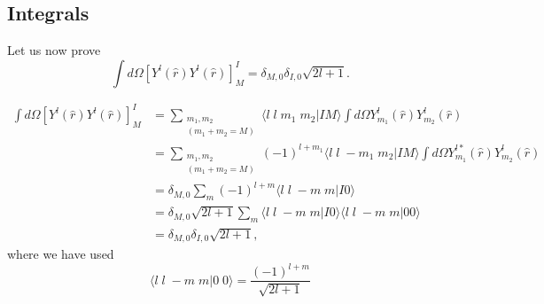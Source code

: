 \begin{subappendices}
\subsection{Integrals}
Let us now prove
\begin{equation}\label{eq14}
\int d\Omega \left[ Y^{l}(\hat r)Y^{l}(\hat r) \right]^{I}_{M}=\delta_{M,0}\delta_{I,0}\sqrt{2l+1}.
\end{equation}

\begin{equation}\label{eq15}
\begin{split}
\int d\Omega \left[ Y^{l}(\hat r)Y^{l}(\hat r) \right]^{I}_{M}&= \sum_{\substack{m_1,m_2\\(m_1+m_2=M)}}
\langle l\; l \; m_1\;m_2 | I M\rangle \int d\Omega  Y_{m_1}^{l}(\hat r)Y_{m_2}^{l}(\hat r)\\
&=\sum_{\substack{m_1,m_2\\(m_1+m_2=M)}} (-1)^{l+m_1} \langle l\; l \; -m_1\;m_2 | I M\rangle
\int d\Omega  Y_{m_1}^{l*}(\hat r)Y_{m_2}^{l}(\hat r)\\
&= \delta_{M,0}\sum_m (-1)^{l+m} \langle l\; l \; -m\;m | I 0\rangle \\
&= \delta_{M,0}\sqrt{2l+1}\sum_m  \langle l\; l \; -m\;m | I 0\rangle \langle l\; l \; -m\;m | 0 0\rangle \\
&= \delta_{M,0}\delta_{I,0}\sqrt{2l+1},
\end{split}
\end{equation}
where we have used
\begin{equation}\label{eq22}
\langle l \;l \; -m \;m | 0\; 0 \rangle=\frac{(-1)^{l+m}}{\sqrt{2l+1}}
\end{equation}


\end{subappendices}
